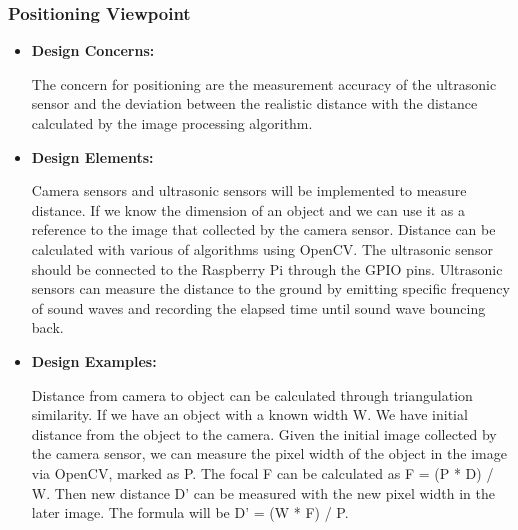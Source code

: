 \documentclass[onecolumn, draftclsnofoot,10pt, compsoc]{IEEEtran}
\begin{document}
\subsubsection{Positioning Viewpoint} %
\begin{itemize}
\item{ \textbf{Design Concerns:}}

The concern for positioning are the measurement accuracy of the ultrasonic sensor and the deviation between the realistic distance with the distance calculated by the image processing algorithm.

\item{ \textbf{Design Elements:}}

Camera sensors and ultrasonic sensors will be implemented to measure distance\cite{r15}. If we know the dimension of an object and we can use it as a reference to the image that collected by the camera sensor. Distance can be calculated with various of algorithms using OpenCV\cite{r13}. The ultrasonic sensor should be connected to the Raspberry Pi through the GPIO pins. Ultrasonic sensors can measure the distance to the ground by emitting specific frequency of sound waves and recording the elapsed time until sound wave bouncing back.

\item{ \textbf{Design Examples:}} %

Distance from camera to object can be calculated through triangulation similarity. If we have an object with a known width W. We have initial distance from the object to the camera. Given the initial image collected by the camera sensor, we can measure the pixel width of the object in the image via OpenCV, marked as P. The focal F can be calculated as F = (P * D) / W. Then new distance D’ can be measured with the new pixel width in the later image. The formula will be D’ = (W * F) / P.\\
\end{itemize}
\end{document}
